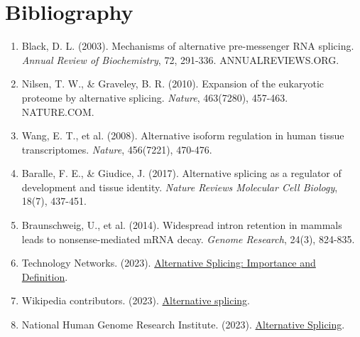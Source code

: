 \documentclass[12pt,a4paper]{article}
\begin{document}
	\newpage
	\section*{Bibliography}
	\begin{enumerate}
		\item Black, D. L. (2003). Mechanisms of alternative pre-messenger RNA splicing. \textit{Annual Review of Biochemistry}, 72, 291-336. ANNUALREVIEWS.ORG.
		\item Nilsen, T. W., \& Graveley, B. R. (2010). Expansion of the eukaryotic proteome by alternative splicing. \textit{Nature}, 463(7280), 457-463. NATURE.COM.
		\item Wang, E. T., et al. (2008). Alternative isoform regulation in human tissue transcriptomes. \textit{Nature}, 456(7221), 470-476.
		\item Baralle, F. E., \& Giudice, J. (2017). Alternative splicing as a regulator of development and tissue identity. \textit{Nature Reviews Molecular Cell Biology}, 18(7), 437-451.
		\item Braunschweig, U., et al. (2014). Widespread intron retention in mammals leads to nonsense-mediated mRNA decay. \textit{Genome Research}, 24(3), 824-835.
		\item Technology Networks. (2023). \href{https://www.technologynetworks.com/genomics/articles/alternative-splicing-importance-and-definition-351813}{Alternative Splicing: Importance and Definition}.
		\item Wikipedia contributors. (2023). \href{https://en.wikipedia.org/wiki/Alternative_splicing}{Alternative splicing}.
		\item National Human Genome Research Institute. (2023). \href{https://www.genome.gov/genetics-glossary/Alternative-Splicing}{Alternative Splicing}.
	\end{enumerate}
	
\end{document}
